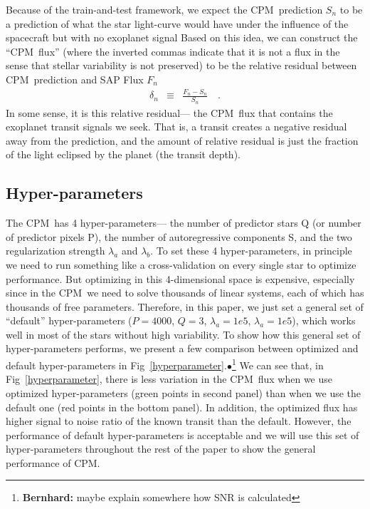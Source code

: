 \documentclass[12pt, preprint]{aastex}
\newcommand{\name}{CPM}
\newcommand{\Bernhard}[1]{$\bullet$\footnote{{\bf Bernhard:} #1}}
\begin{document}
Because of the train-and-test framework,  
  we expect the \name\ prediction $S_{n}$ to be a prediction of
  what the star light-curve would have under the influence of the spacecraft but with no exoplanet signal 
Based on this idea, 
  we can construct the ``\name\ flux'' 
  (where the inverted commas indicate that it is not a flux in the sense that stellar variability is not preserved) 
  to be the relative residual between \name\ prediction and SAP Flux $F_{n}$
\begin{eqnarray}
\delta_{n}&\equiv&\frac{F_{n} - S_{n}}{S_{n}}
\quad .
\end{eqnarray} 
In some sense, it is this relative residual--- the \name\ flux that contains the exoplanet transit signals we seek. 
That is, a transit creates a negative residual away from the prediction, 
  and the amount of relative residual is just the fraction of the light eclipsed by the planet (the transit depth). 

\subsection{Hyper-parameters}
The \name\ has 4 hyper-parameters--- 
  the number of predictor stars Q (or number of predictor pixels P), 
  the number of autoregressive components S, 
  and the two regularization strength $\lambda_{a}$ and $\lambda_{b}$.
To set these 4 hyper-parameters, 
  in principle we need to run something like a cross-validation on every single star to optimize performance.
But optimizing in this 4-dimensional space is expensive, 
  especially since in the \name\ we need to solve thousands of linear systems, 
  each of which has thousands of free parameters. 
Therefore, in this paper, 
  we just set a general set of ``default'' hyper-parameters ($P=4000$, $Q=3$, $\lambda_a=1e5$, $\lambda_a=1e5$), 
  which works well in most of the stars without high variability. 
To show how this general set of hyper-parameters performs, 
  we present a few comparison between optimized and default hyper-parameters 
  in Fig~\ref{hyperparameter}.\Bernhard{maybe explain somewhere how SNR is calculated}  
We can see that, in Fig~\ref{hyperparameter}, 
  there is less variation in the \name\ flux 
  when we use optimized hyper-parameters (green points in second panel) 
  than when we use the default one (red points in the bottom panel). 
In addition, the optimized flux has higher signal to noise ratio of the known transit than the default. 
However, the performance of default hyper-parameters is acceptable 
  and we will use this set of hyper-parameters throughout the rest of the paper 
  to show the general performance of \name.
\end{document}
